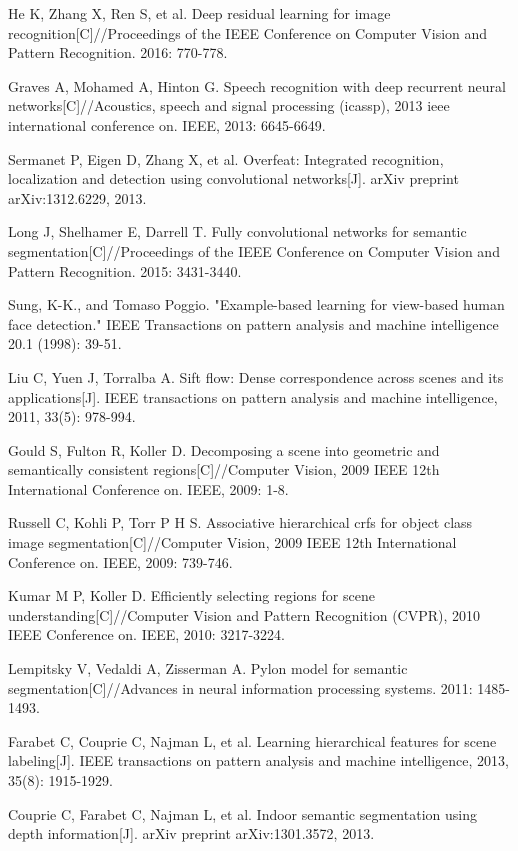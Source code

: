 \documentclass[10.5pt,compsoc]{TsT}
\theoremstyle{mystyle}
\begin{document}
{\begin{thebibliography}{99}
He K, Zhang X, Ren S, et al. Deep residual learning for image recognition[C]//Proceedings of the IEEE Conference on Computer Vision and Pattern Recognition. 2016: 770-778.

Graves A, Mohamed A, Hinton G. Speech recognition with deep recurrent neural networks[C]//Acoustics, speech and signal processing (icassp), 2013 ieee international conference on. IEEE, 2013: 6645-6649.

Sermanet P, Eigen D, Zhang X, et al. Overfeat: Integrated recognition, localization and detection using convolutional networks[J]. arXiv preprint arXiv:1312.6229, 2013.

Long J, Shelhamer E, Darrell T. Fully convolutional networks for semantic segmentation[C]//Proceedings of the IEEE Conference on Computer Vision and Pattern Recognition. 2015: 3431-3440.

Sung, K-K., and Tomaso Poggio. "Example-based learning for view-based human face detection." IEEE Transactions on pattern analysis and machine intelligence 20.1 (1998): 39-51.

Liu C, Yuen J, Torralba A. Sift flow: Dense correspondence across scenes and its applications[J]. IEEE transactions on pattern analysis and machine intelligence, 2011, 33(5): 978-994.

Gould S, Fulton R, Koller D. Decomposing a scene into geometric and semantically consistent regions[C]//Computer Vision, 2009 IEEE 12th International Conference on. IEEE, 2009: 1-8.

Russell C, Kohli P, Torr P H S. Associative hierarchical crfs for object class image segmentation[C]//Computer Vision, 2009 IEEE 12th International Conference on. IEEE, 2009: 739-746.

Kumar M P, Koller D. Efficiently selecting regions for scene understanding[C]//Computer Vision and Pattern Recognition (CVPR), 2010 IEEE Conference on. IEEE, 2010: 3217-3224.

Lempitsky V, Vedaldi A, Zisserman A. Pylon model for semantic segmentation[C]//Advances in neural information processing systems. 2011: 1485-1493.

Farabet C, Couprie C, Najman L, et al. Learning hierarchical features for scene labeling[J]. IEEE transactions on pattern analysis and machine intelligence, 2013, 35(8): 1915-1929.

Couprie C, Farabet C, Najman L, et al. Indoor semantic segmentation using depth information[J]. arXiv preprint arXiv:1301.3572, 2013.


\end{thebibliography}}
\end{document}
